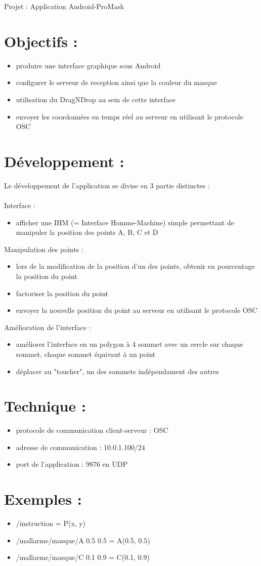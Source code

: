 \documentclass[a4paper, notitlepage, twoside]{article}
\begin{document}
Projet : Application Android-ProMask

\section{Objectifs :}
\begin{itemize}
	\item produire une interface graphique sous Android
	\item configurer le serveur de reception ainsi que la couleur du masque 
	\item utilisation du DragNDrop au sein de cette interface
	\item envoyer les coordonnées en temps réel au serveur en utilisant le protocole OSC
\end{itemize}

\section{Développement :}
Le développement de l'application se divise en 3 partie distinctes :
\\ \\
\noindent Interface :
\begin{itemize}
	\item afficher une IHM (= Interface Homme-Machine) simple permettant de manipuler la position des points A, B, C et D
\end{itemize}
Manipulation des points :
\begin{itemize}
	\item lors de la modification de la position d'un des points, obtenir en pourcentage la position du point
	\item factoriser la position du point
	\item envoyer la nouvelle position du point au serveur en utilisant le protocole OSC
\end{itemize}
	Amélioration de l'interface :
\begin{itemize}
	\item améliorer l'interface en un polygon à 4 sommet avec un cercle sur chaque sommet, chaque sommet équivaut à un point
	\item déplacer au "toucher", un des sommets indépendament des autres
\end{itemize}

\section{Technique :}
\begin{itemize}
	\item protocole de communication client-serveur : OSC
	\item adresse de communication : 10.0.1.100/24
	\item port de l'application : 9876 en UDP
\end{itemize}


\section{Exemples :}
\begin{itemize}
	\item /instruction = P(x, y)
	\item /mallarme/masque/A 0.5 0.5 = A(0.5, 0.5)
	\item /mallarme/masque/C 0.1 0.9 = C(0.1, 0.9)
\end{itemize}
\end{document}
